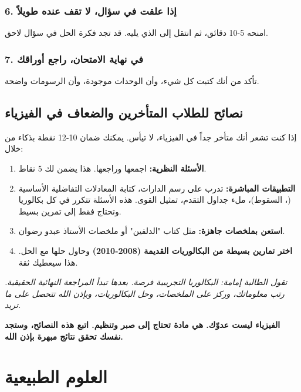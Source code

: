 \documentclass[12pt,a4paper]{book}
\newcommand{\quoteAr}[1]{%
	\begin{myquote}
		\itshape #1
	\end{myquote}
}
\newcommand{\importantAr}[1]{%
	\begin{important}
		\bfseries #1
	\end{important}
}
\begin{document}
	\subsubsection*{6. إذا علقت في سؤال، لا تقف عنده طويلاً}
	امنحه 5-10 دقائق، ثم انتقل إلى الذي يليه. قد تجد فكرة الحل في سؤال لاحق.
	
	\subsubsection*{7. في نهاية الامتحان، راجع أوراقك}
	تأكد من أنك كتبت كل شيء، وأن الوحدات موجودة، وأن الرسومات واضحة.
	
	\subsection{نصائح للطلاب المتأخرين والضعاف في الفيزياء}
	\label{sec:random-tips9}
	إذا كنت تشعر أنك متأخر جداً في الفيزياء، لا تيأس. يمكنك ضمان 10-12 نقطة بذكاء من خلال:
	
	\begin{enumerate}
		\item \textbf{الأسئلة النظرية:} اجمعها وراجعها. هذا يضمن لك 5 نقاط.
		\item \textbf{التطبيقات المباشرة:} تدرب على رسم الدارات، كتابة المعادلات \newline التفاضلية الأساسية (، السقوط)، ملء جداول التقدم، تمثيل القوى. هذه الأسئلة تتكرر في كل بكالوريا وتحتاج فقط إلى تمرين بسيط.
		\item \textbf{استعن بملخصات جاهزة:} مثل كتاب "الدلفين" أو ملخصات الأستاذ عبدو رضوان.
		\item \textbf{اختر تمارين بسيطة من البكالوريات القديمة (2008-2010)} وحاول حلها مع الحل. هذا سيعطيك ثقة.
	\end{enumerate}
	
	\quoteAr{تقول الطالبة إمامة: البكالوريا التجريبية فرصة. بعدها تبدأ المراجعة النهائية الحقيقية. رتب معلوماتك، وركز على الملخصات، وحل البكالوريات، وبإذن الله تتحصل على ما تريد.}
	


	
	\importantAr{الفيزياء ليست عدوّك. هي مادة تحتاج إلى صبر وتنظيم. اتبع هذه النصائح، وستجد نفسك تحقق نتائج مبهرة بإذن الله.}
	
	\section{العلوم الطبيعية}
	
\end{document}
